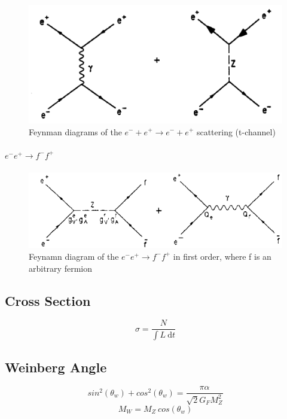 \begin{figure}[hb]
	\centering
	\includegraphics{graphics/BhabbaStreuung.png}
	\caption{Feynman diagrams of the $e^- + e^+ \rightarrow e^- + e^+$ scattering (t-channel)}
	\label{fig:principles:BhabbaStreuung.png}
\end{figure}
 
\paragraph{$e^-e^+ \rightarrow f^-f^+$}
\begin{figure}[hb]
	\centering
	\includegraphics{graphics/annihilation.png}
	\caption{Feynamn diagram of the $e^-e^+ \rightarrow f^-f^+$ in first order, where f is an arbitrary fermion}
\end{figure}

\subsection{Cross Section}
\begin{equation}
\sigma = \frac{N}{\int L~\text{d}t}
\end{equation}
\subsection{Weinberg Angle}
\begin{equation}
sin^2(\theta_w)+cos^2(\theta_w) = \frac{\pi\alpha}{\sqrt{2}G_FM_Z^2}
\end{equation}
\begin{equation}
M_W = M_Z~cos(\theta_w)
\end{equation}
